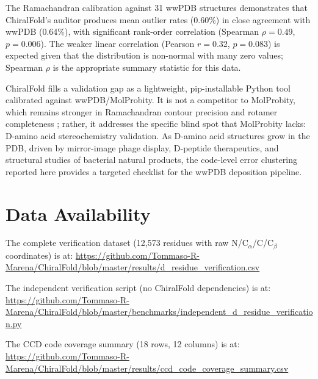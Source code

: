 \documentclass[11pt]{article}
\begin{document}
The Ramachandran calibration against 31 wwPDB structures demonstrates that
ChiralFold's auditor produces mean outlier rates (0.60\%) in close agreement
with wwPDB (0.64\%), with significant rank-order correlation (Spearman
$\rho = 0.49$, $p = 0.006$). The weaker linear correlation (Pearson
$r = 0.32$, $p = 0.083$) is expected given that the distribution is
non-normal with many zero values; Spearman $\rho$ is the appropriate
summary statistic for this data.

ChiralFold fills a validation gap as a lightweight, pip-installable
Python tool calibrated against wwPDB/MolProbity. It is not a competitor
to MolProbity, which remains stronger in Ramachandran contour precision
and rotamer completeness \citep{chen2010,lovell2003}; rather, it addresses
the specific blind spot that MolProbity lacks: D-amino acid stereochemistry
validation. As D-amino acid structures grow in the PDB, driven by
mirror-image phage display, D-peptide therapeutics, and structural
studies of bacterial natural products, the code-level error clustering
reported here provides a targeted checklist for the wwPDB deposition
pipeline.

\section{Data Availability}

The complete verification dataset (12,573 residues with raw N/C$_\alpha$/C/C$_\beta$
coordinates) is at:
\url{https://github.com/Tommaso-R-Marena/ChiralFold/blob/master/results/d_residue_verification.csv}

The independent verification script (no ChiralFold dependencies) is at:
\url{https://github.com/Tommaso-R-Marena/ChiralFold/blob/master/benchmarks/independent_d_residue_verification.py}

The CCD code coverage summary (18 rows, 12 columns) is at:
\url{https://github.com/Tommaso-R-Marena/ChiralFold/blob/master/results/ccd_code_coverage_summary.csv}
\end{document}
